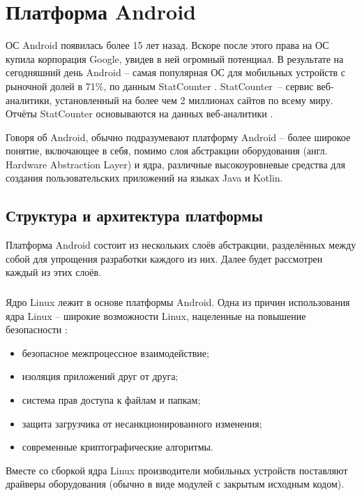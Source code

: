 
\section{Платформа Android}
\label{sec:android_platform}

ОС Android появилась более 15 лет назад.
Вскоре после этого права на ОС купила корпорация Google, увидев в ней огромный потенциал.
В результате на сегодняшний день Android -- самая популярная ОС для мобильных устройств с рыночной долей в 71\%, по данным StatCounter \cite{statcounter_mobile_os}.
StatCounter~-- сервис веб-аналитики, установленный на более чем 2 миллионах сайтов по всему миру.
Отчёты StatCounter основываются на данных веб-аналитики \cite{statcounter_methodology}.

Говоря об Android, обычно подразумевают платформу Android -- более широкое понятие, включающее в себя, помимо слоя абстракции оборудования (англ. Hardware Abstraction Layer) и ядра, различные высокоуровневые средства для создания пользовательских приложений на языках Java и Kotlin.

\subsection{Структура и архитектура платформы}
\label{sub:android_platform:struct_and_arch}

Платформа Android состоит из нескольких слоёв абстракции, разделённых между собой для упрощения разработки каждого из них.
Далее будет рассмотрен каждый из этих слоёв.

\subsubsection{}
\label{subsub:android_platform:struct_and_arch:linux}
Ядро Linux лежит в основе платформы Android.
Одна из причин использования ядра Linux -- широкие возможности Linux, нацеленные на повышение безопасности \cite{android_kernel_security}:
\begin{itemize}
	\item безопасное межпроцессное взаимодействие;
	\item изоляция приложений друг от друга;
	\item система прав доступа к файлам и папкам;
	\item защита загрузчика от несанкционированного изменения;
	\item современные криптографические алгоритмы.
\end{itemize}
Вместе со сборкой ядра Linux производители мобильных устройств поставляют драйверы оборудования (обычно в виде модулей с закрытым исходным кодом).

